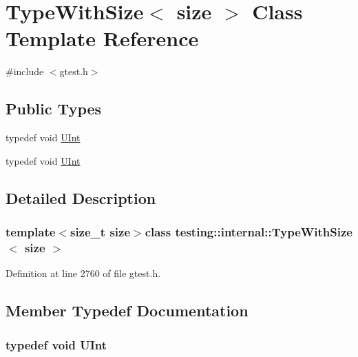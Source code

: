 \hypertarget{classtesting_1_1internal_1_1TypeWithSize}{\section{\-Type\-With\-Size$<$ size $>$ \-Class \-Template \-Reference}
\label{db/dae/classtesting_1_1internal_1_1TypeWithSize}
}


{\ttfamily \#include $<$gtest.\-h$>$}

\subsection*{\-Public \-Types}
\begin{DoxyCompactItemize}
\item 
typedef void \hyperlink{classtesting_1_1internal_1_1TypeWithSize_adfade8609e616ed641c69c10c34622fc}{\-U\-Int}
\item 
typedef void \hyperlink{classtesting_1_1internal_1_1TypeWithSize_adfade8609e616ed641c69c10c34622fc}{\-U\-Int}
\end{DoxyCompactItemize}


\subsection{\-Detailed \-Description}
\subsubsection*{template$<$size\-\_\-t size$>$class testing\-::internal\-::\-Type\-With\-Size$<$ size $>$}



\-Definition at line 2760 of file gtest.\-h.



\subsection{\-Member \-Typedef \-Documentation}
\hypertarget{classtesting_1_1internal_1_1TypeWithSize_adfade8609e616ed641c69c10c34622fc}{
\subsubsection[{\-U\-Int}]{\setlength{\rightskip}{0pt plus 5cm}typedef void {\bf \-U\-Int}}}\label{db/dae/classtesting_1_1internal_1_1TypeWithSize_adfade8609e616ed641c69c10c34622fc}



